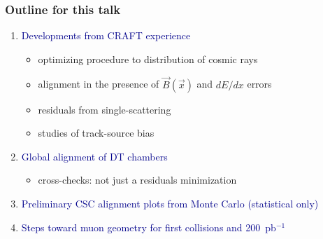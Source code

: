 \documentclass[compress]{beamer}
\begin{document}
\begin{frame}
\frametitle{Outline for this talk}
\begin{enumerate}\setlength{\itemsep}{0.6 cm}
\item \textcolor{darkblue}{Developments from CRAFT experience}
\begin{itemize}\setlength{\itemsep}{0.2 cm}
\item optimizing procedure to distribution of cosmic rays
\item alignment in the presence of $\vec{B}(\vec{x})$ and $dE/dx$ errors
\item residuals from single-scattering
\item studies of track-source bias
\end{itemize}
\item \textcolor{darkblue}{Global alignment of DT chambers}
\begin{itemize}\setlength{\itemsep}{0.2 cm}
\item cross-checks: not just a residuals minimization
\end{itemize}
\item \textcolor{darkblue}{Preliminary CSC alignment plots from Monte Carlo (statistical only)}
\item \textcolor{darkblue}{Steps toward muon geometry for first collisions and 200~pb$^{-1}$}
\end{enumerate}
\end{frame}

\end{document}
